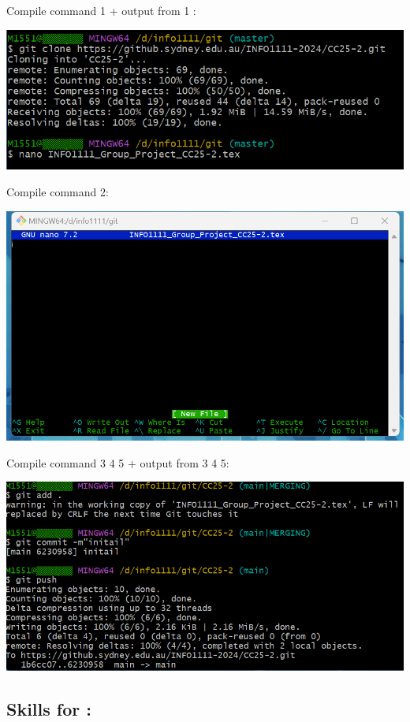 \documentclass[a4paper, 11pt]{report}
\begin{document}
Compile command 1 + output from 1 :

\includegraphics{ZIXI MAI clone and edit}

Compile command 2:

\includegraphics{ZIXI MAI edit}

Compile command 3 4 5 + output from 3 4 5:

\includegraphics{ZIXI MAI push}


\subsection{Skills for \majC: \studC}
\end{document}
